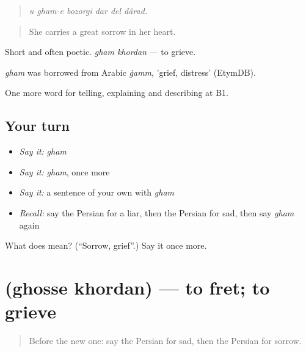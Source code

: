 \begin{quote}
\emph{u gham-e bozorgi dar del dârad.}
\end{quote}

\begin{quote}
She carries a great sorrow in her heart.
\end{quote}

Short and often poetic. \emph{gham khordan} — to grieve.

\begin{cousinweb}
\emph{gham} was borrowed from Arabic \emph{ġamm}, 'grief, distress' (EtymDB).
\end{cousinweb}

\begin{grammarlens}[title={What you've built}]
One more word for telling, explaining and describing at B1.
\end{grammarlens}

\subsection*{Your turn}
\begin{itemize}
\raggedright
  \item \emph{Say it:} \emph{gham}
  \item \emph{Say it:} \emph{gham}, once more
  \item \emph{Say it:} a sentence of your own with \emph{gham}
  \item \emph{Recall:} say the Persian for a liar, then the Persian for sad, then say \emph{gham} again
\end{itemize}

\begin{tcolorbox}[breakable,colback=teal!4,colframe=teal!35!black,title={Before you move on}]
What does  mean? (\textquotedblleft{}Sorrow, grief\textquotedblright{}.) Say it once more.
\end{tcolorbox}
\section[\texorpdfstring{\fa{غصه} \fa{خوردن} (ghosse khordan)}{غصه خوردن (ghosse khordan)}]{  (ghosse khordan) — to fret; to grieve}

\label{lesson:FA-C484-ghosse-khordan}



\begin{quote}
Before the new one: say the Persian for sad, then the Persian for sorrow.
\end{quote}

